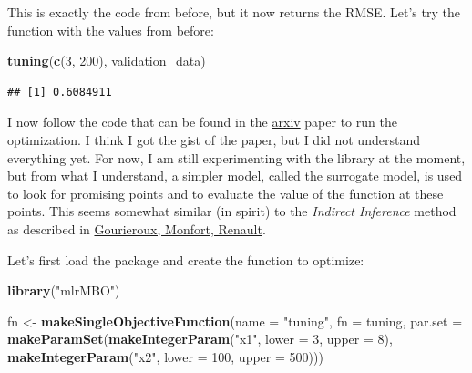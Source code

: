 \documentclass[]{gitbook}
\newenvironment{Shaded}{\begin{snugshade}}{\end{snugshade}}
\newcommand{\DataTypeTok}[1]{\textcolor[rgb]{0.13,0.29,0.53}{#1}}
\newcommand{\DecValTok}[1]{\textcolor[rgb]{0.00,0.00,0.81}{#1}}
\newcommand{\KeywordTok}[1]{\textcolor[rgb]{0.13,0.29,0.53}{\textbf{#1}}}
\newcommand{\NormalTok}[1]{#1}
\newcommand{\StringTok}[1]{\textcolor[rgb]{0.31,0.60,0.02}{#1}}
\theoremstyle{definition}
\theoremstyle{definition}
\theoremstyle{definition}
\theoremstyle{remark}
\begin{document}
This is exactly the code from before, but it now returns the RMSE. Let's
try the function with the values from before:

\begin{Shaded}
\begin{Highlighting}[]
\KeywordTok{tuning}\NormalTok{(}\KeywordTok{c}\NormalTok{(}\DecValTok{3}\NormalTok{, }\DecValTok{200}\NormalTok{), validation_data)}
\end{Highlighting}
\end{Shaded}

\begin{verbatim}
## [1] 0.6084911
\end{verbatim}

I now follow the code that can be found in the
\href{https://arxiv.org/abs/1703.03373}{arxiv} paper to run the
optimization. I think I got the gist of the paper, but I did not
understand everything yet. For now, I am still experimenting with the
library at the moment, but from what I understand, a simpler model,
called the surrogate model, is used to look for promising points and to
evaluate the value of the function at these points. This seems somewhat
similar (in spirit) to the \emph{Indirect Inference} method as described
in \href{https://www.jstor.org/stable/2285076}{Gourieroux, Monfort,
Renault}.

Let's first load the package and create the function to optimize:

\begin{Shaded}
\begin{Highlighting}[]
\KeywordTok{library}\NormalTok{(}\StringTok{"mlrMBO"}\NormalTok{)}
\end{Highlighting}
\end{Shaded}

\begin{Shaded}
\begin{Highlighting}[]
\NormalTok{fn <-}\StringTok{ }\KeywordTok{makeSingleObjectiveFunction}\NormalTok{(}\DataTypeTok{name =} \StringTok{"tuning"}\NormalTok{,}
                                 \DataTypeTok{fn =}\NormalTok{ tuning,}
                                 \DataTypeTok{par.set =} \KeywordTok{makeParamSet}\NormalTok{(}\KeywordTok{makeIntegerParam}\NormalTok{(}\StringTok{"x1"}\NormalTok{, }\DataTypeTok{lower =} \DecValTok{3}\NormalTok{, }\DataTypeTok{upper =} \DecValTok{8}\NormalTok{),}
                                                        \KeywordTok{makeIntegerParam}\NormalTok{(}\StringTok{"x2"}\NormalTok{, }\DataTypeTok{lower =} \DecValTok{100}\NormalTok{, }\DataTypeTok{upper =} \DecValTok{500}\NormalTok{)))}
\end{Highlighting}
\end{Shaded}
\end{document}
